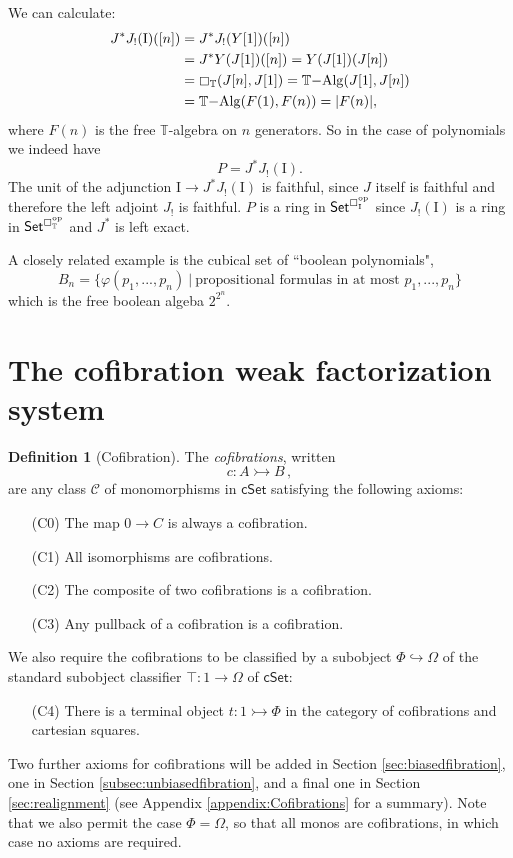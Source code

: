 \documentclass[12pt]{article}
\newcommand{\C}{\ensuremath{\boxempty}}
\newcommand{\T}{\ensuremath{\mathbb{T}}}
\newcommand{\psh}[1]{\ensuremath{\mathsf{Set}^{#1^{\mathrm{op}}}}}
\newcommand{\hook}{\ensuremath{\hookrightarrow}}
\newcommand{\mono}{\ensuremath{\rightarrowtail}}
\renewcommand{\to}{\ensuremath{\rightarrow}}
\newcommand{\I}{\ensuremath{\mathrm{I}}}
\theoremstyle{remark}
\theoremstyle{definition}
\newtheorem{definition}[theorem]{Definition}
\begin{document}
We can calculate:
\begin{equation}
\begin{split}
J^* J_! ( \I )( [n] ) &= J^* J_! ( Y[1] )( [n] )\\
 &= J^* Y( J[1] )( [n] ) = Y( J[1] )( J[n] ) \\
 &= \C_\T( J[n] , J[1] ) = \T\mathrm{-Alg}( J[1] , J[n] ) \\
 &= \T\mathrm{-Alg}( F(1) , F(n) ) = | F(n) |,
\end{split}
\end{equation}
where $F(n)$ is the free $\T$-algebra on $n$ generators.  So in the case of polynomials we indeed have 
$$P = J^* J_! ( \I ).$$
The unit of the adjunction $\I \to J^* J_! ( \I )$ is faithful, since $J$ itself is faithful and therefore the left adjoint $J_!$ is faithful.
$P$ is a ring in $\psh{\C_\I}$ since $J_!(\I)$ is a ring in $\psh{\C_\T}$ and $J^*$ is left exact.

A closely related example is the cubical set of ``boolean polynomials",
\[
B_n = \{ \varphi(p_1, ...,  p_n)\ |\ \text{propositional formulas in at most $p_1, ...,  p_n$} \}
\]
which is the free boolean algeba $2^{2^n}$.  

\section{The cofibration weak factorization system}\label{sec:cofibrations}

\begin{definition}[Cofibration]\label{def:cofibration}
The \emph{cofibrations}, written $$c : A \mono B\,,$$ are any class $\mathcal{C}$ of monomorphisms in $\mathsf{cSet}$
satisfying the following axioms:
\begin{enumerate}
\item[(C0)] The map $0\to C$ is always a cofibration.
\item[(C1)] All isomorphisms are cofibrations.
\item[(C2)] The composite of two cofibrations is a cofibration.
\item[(C3)] Any pullback of a cofibration is a cofibration.
\end{enumerate}
We also require the cofibrations to be classified by a subobject $\Phi \hook \Omega$ of the standard subobject classifier $\top: 1 \to \Omega$ of $\mathsf{cSet}$:
\begin{enumerate}
\item[(C4)] There is a terminal object $t:1\mono \Phi$ in the category of cofibrations and cartesian squares.
\end{enumerate}
Two further axioms for cofibrations will be added in Section \ref{sec:biasedfibration}, one in Section \ref{subsec:unbiasedfibration}, and a final one in Section \ref{sec:realignment} (see Appendix \ref{appendix:Cofibrations} for a summary).  Note that we also permit the case $\Phi = \Omega$, so that all monos are cofibrations, in which case no axioms are required.
\end{definition}
\end{document}
